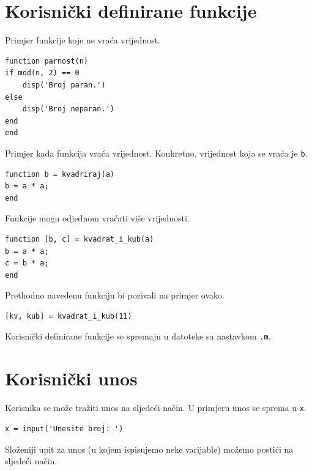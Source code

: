 \documentclass[a4paper, 10pt]{article}
\begin{document}

\section{Korisnički definirane funkcije}

Primjer funkcije koje ne vraća vrijednost.

\begin{lstlisting}
function parnost(n)
if mod(n, 2) == 0
    disp('Broj paran.')
else
    disp('Broj neparan.')
end
end
\end{lstlisting}

Primjer kada funkcija vraća vrijednost. Konkretno, vrijednost koja se vraća je \texttt{b}.

\begin{lstlisting}
function b = kvadriraj(a)
b = a * a;
end
\end{lstlisting}

Funkcije mogu odjednom vraćati više vrijednosti.

\begin{lstlisting}
function [b, c] = kvadrat_i_kub(a)
b = a * a;
c = b * a;
end
\end{lstlisting}

Prethodno navedenu funkciju bi pozivali na primjer ovako.

\begin{lstlisting}
[kv, kub] = kvadrat_i_kub(11)
\end{lstlisting}

Korisnički definirane funkcije se spremaju u datoteke sa nastavkom \texttt{.m}.


\section{Korisnički unos}

Korisnika se može tražiti unos na sljedeći način. U primjeru unos se sprema u \texttt{x}.

\begin{lstlisting}
x = input('Unesite broj: ')
\end{lstlisting}

Složeniji upit za unos (u kojem ispisujemo neke varijable) možemo postići na sljedeći način.
\end{document}
